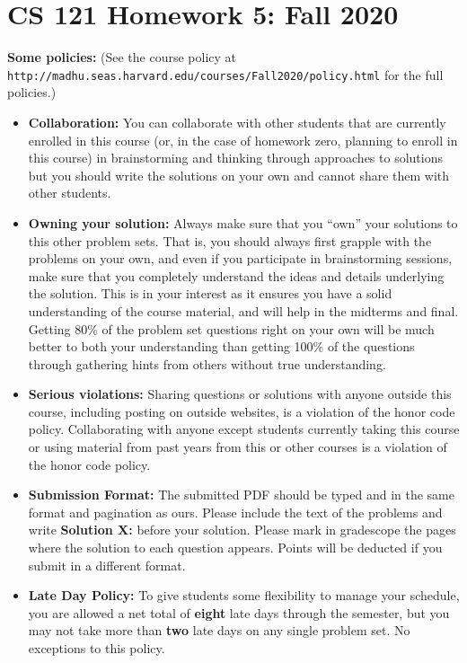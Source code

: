 \documentclass[11pt]{article}
\begin{document}
	
	\section*{CS 121 Homework 5: Fall
		2020}\label{cs-121-homework-zero-fall-2020}
	
	\textbf{Some policies:} (See the course policy at  {\tt http://madhu.seas.harvard.edu/courses/Fall2020/policy.html} for the
	full policies.)
	
	\begin{itemize}
		\item
		{\bf Collaboration:} You can collaborate with other students that are currently enrolled in
		this course (or, in the case of homework zero, planning to enroll in
		this course) in brainstorming and thinking through approaches to
		solutions but you should write the solutions on your own and cannot
		share them with other students. 
		\item
		{\bf Owning your solution:} Always make sure that you ``own'' your solutions to this other problem
		sets. That is, you should always first grapple with the problems on
		your own, and even if you participate in brainstorming sessions, make
		sure that you completely understand the ideas and details underlying
		the solution. This is in your interest as it ensures you have a solid
		understanding of the course material, and will help in the midterms
		and final. Getting 80\% of the problem
		set questions right on your own will be much better to both your
		understanding than getting 100\% of the questions through
		gathering hints from others without true understanding.
		\item
		{\bf Serious violations:} Sharing questions or solutions with anyone outside this course,
		including posting on outside websites, is a violation of the honor
		code policy. Collaborating with anyone except students currently
		taking this course or using material from past years from this or
		other courses is a violation of the honor code policy.
		\item
		{\bf Submission Format:} The submitted PDF should be typed and in the same format and
		pagination as ours. Please include the text of the problems and write
		\textbf{Solution X:} before your solution. Please mark in gradescope 
		the pages where
		the solution to each question appears. Points will be deducted if you
		submit in a different format.
		\item {\bf Late Day Policy:} To give students some flexibility to manage your schedule, you are allowed a net total of {\bf eight} late days through the semester, but you may not take more than {\bf two} late days on any single problem set. No exceptions to this policy. 
	\end{itemize}
	
\end{document}

